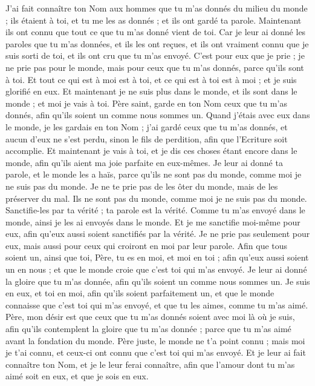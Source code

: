 \begin{multicols}{2}
J'ai fait connaître ton Nom aux hommes que tu m'as donnés du milieu du monde ; ils étaient à toi, et tu me les as donnés ; et ils ont gardé ta parole.
Maintenant ils ont connu que tout ce que tu m'as donné vient de toi.
Car je leur ai donné les paroles que tu m'as données, et ils les ont reçues, et ils ont vraiment connu que je suis sorti de toi, et ils ont cru que tu m'as envoyé.
C'est pour eux que je prie ; je ne prie pas pour le monde, mais pour ceux que tu m'as donnés, parce qu'ils sont à toi.
Et tout ce qui est à moi est à toi, et ce qui est à toi est à moi ; et je suis glorifié en eux.
Et maintenant je ne suis plus dans le monde, et ils sont dans le monde ; et moi je vais à toi. Père saint, garde en ton Nom ceux que tu m'as donnés, afin qu'ils soient un comme nous sommes un.
Quand j'étais avec eux dans le monde, je les gardais en ton Nom ; j'ai gardé ceux que tu m'as donnés, et aucun d'eux ne s'est perdu, sinon le fils de perdition, afin que l'Ecriture soit accomplie.
Et maintenant je vais à toi, et je dis ces choses étant encore dans le monde, afin qu'ils aient ma joie parfaite en eux-mêmes.
Je leur ai donné ta parole, et le monde les a haïs, parce qu'ils ne sont pas du monde, comme moi je ne suis pas du monde.
Je ne te prie pas de les ôter du monde, mais de les préserver du mal.
Ils ne sont pas du monde, comme moi je ne suis pas du monde.
Sanctifie-les par ta vérité ; ta parole est la vérité.
Comme tu m'as envoyé dans le monde, ainsi je les ai envoyés dans le monde.
Et je me sanctifie moi-même pour eux, afin qu'eux aussi soient sanctifiés par la vérité.
Je ne prie pas seulement pour eux, mais aussi pour ceux qui croiront en moi par leur parole.
Afin que tous soient un, ainsi que toi, Père, tu es en moi, et moi en toi ; afin qu'eux aussi soient un en nous ; et que le monde croie que c'est toi qui m'as envoyé.
Je leur ai donné la gloire que tu m'as donnée, afin qu'ils soient un comme nous sommes un.
Je suis en eux, et toi en moi, afin qu'ils soient parfaitement un, et que le monde connaisse que c'est toi qui m'as envoyé, et que tu les aimes, comme tu m'as aimé.
Père, mon désir est que ceux que tu m'as donnés soient avec moi là où je suis, afin qu'ils contemplent la gloire que tu m'as donnée ; parce que tu m'as aimé avant la fondation du monde.
Père juste, le monde ne t'a point connu ; mais moi je t'ai connu, et ceux-ci ont connu que c'est toi qui m'as envoyé.
Et je leur ai fait connaître ton Nom, et je le leur ferai connaître, afin que l'amour dont tu m'as aimé soit en eux, et que je sois en eux.

\end{multicols}
